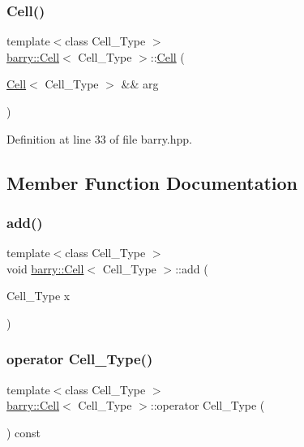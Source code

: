 \subsubsection{\texorpdfstring{Cell()}{Cell()}\hspace{0.1cm}{\footnotesize\ttfamily [5/5]}}
{\footnotesize\ttfamily template$<$class Cell\+\_\+\+Type $>$ \\
\hyperlink{classbarry_1_1_cell}{barry\+::\+Cell}$<$ Cell\+\_\+\+Type $>$\+::\hyperlink{classbarry_1_1_cell}{Cell} (\begin{DoxyParamCaption}\item[{\hyperlink{classbarry_1_1_cell}{Cell}$<$ Cell\+\_\+\+Type $>$ \&\&}]{arg }\end{DoxyParamCaption})\hspace{0.3cm}{\ttfamily [inline]}}



Definition at line 33 of file barry.\+hpp.



\subsection{Member Function Documentation}
\mbox{\label{classbarry_1_1_cell_a40c9aad3ba2c9d5a1a91833c66522ad8}} 
\subsubsection{\texorpdfstring{add()}{add()}}
{\footnotesize\ttfamily template$<$class Cell\+\_\+\+Type $>$ \\
void \hyperlink{classbarry_1_1_cell}{barry\+::\+Cell}$<$ Cell\+\_\+\+Type $>$\+::add (\begin{DoxyParamCaption}\item[{Cell\+\_\+\+Type}]{x }\end{DoxyParamCaption})}

\mbox{\label{classbarry_1_1_cell_a90bea0b3306e1780747ca1ef6f389e91}} 
\subsubsection{\texorpdfstring{operator Cell\+\_\+\+Type()}{operator Cell\_Type()}}
{\footnotesize\ttfamily template$<$class Cell\+\_\+\+Type $>$ \\
\hyperlink{classbarry_1_1_cell}{barry\+::\+Cell}$<$ Cell\+\_\+\+Type $>$\+::operator Cell\+\_\+\+Type (\begin{DoxyParamCaption}{ }\end{DoxyParamCaption}) const\hspace{0.3cm}{\ttfamily [inline]}}



